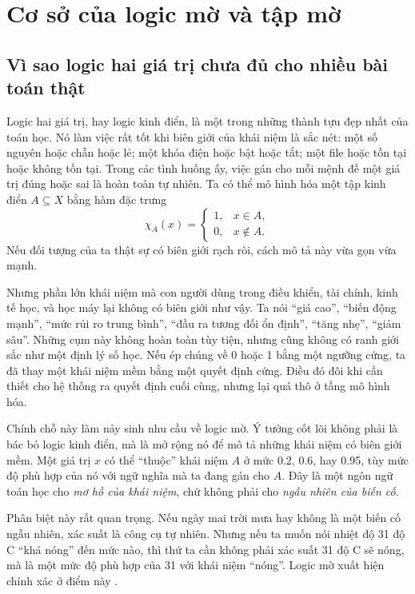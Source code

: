\chapter{Cơ sở của logic mờ và tập mờ}

\section{Vì sao logic hai giá trị chưa đủ cho nhiều bài toán thật}

Logic hai giá trị, hay logic kinh điển, là một trong những thành tựu đẹp nhất của toán học. Nó làm việc rất tốt khi biên giới của khái niệm là sắc nét: một số nguyên hoặc chẵn hoặc lẻ; một khóa điện hoặc bật hoặc tắt; một file hoặc tồn tại hoặc không tồn tại. Trong các tình huống ấy, việc gán cho mỗi mệnh đề một giá trị đúng hoặc sai là hoàn toàn tự nhiên. Ta có thể mô hình hóa một tập kinh điển \(A\subseteq X\) bằng hàm đặc trưng
\[
\chi_A(x)=
\begin{cases}
1, & x\in A,\\
0, & x\notin A.
\end{cases}
\]
Nếu đối tượng của ta thật sự có biên giới rạch ròi, cách mô tả này vừa gọn vừa mạnh.

Nhưng phần lớn khái niệm mà con người dùng trong điều khiển, tài chính, kinh tế học, và học máy lại không có biên giới như vậy. Ta nói ``giá cao'', ``biến động mạnh'', ``mức rủi ro trung bình'', ``đầu ra tương đối ổn định'', ``tăng nhẹ'', ``giảm sâu''. Những cụm này không hoàn toàn tùy tiện, nhưng cũng không có ranh giới sắc như một định lý số học. Nếu ép chúng về 0 hoặc 1 bằng một ngưỡng cứng, ta đã thay một khái niệm mềm bằng một quyết định cứng. Điều đó đôi khi cần thiết cho hệ thống ra quyết định cuối cùng, nhưng lại quá thô ở tầng mô hình hóa.

Chính chỗ này làm nảy sinh nhu cầu về logic mờ. Ý tưởng cốt lõi không phải là bác bỏ logic kinh điển, mà là mở rộng nó để mô tả những khái niệm có biên giới mềm. Một giá trị \(x\) có thể ``thuộc'' khái niệm \(A\) ở mức 0.2, 0.6, hay 0.95, tùy mức độ phù hợp của nó với ngữ nghĩa mà ta đang gán cho \(A\). Đây là một ngôn ngữ toán học cho \emph{mơ hồ của khái niệm}, chứ không phải cho \emph{ngẫu nhiên của biến cố}.

Phân biệt này rất quan trọng. Nếu ngày mai trời mưa hay không là một biến cố ngẫu nhiên, xác suất là công cụ tự nhiên. Nhưng nếu ta muốn nói nhiệt độ 31 độ C ``khá nóng'' đến mức nào, thì thứ ta cần không phải xác suất 31 độ C sẽ nóng, mà là một mức độ phù hợp của 31 với khái niệm ``nóng''. Logic mờ xuất hiện chính xác ở điểm này \citep{zadeh1965fuzzy}.

